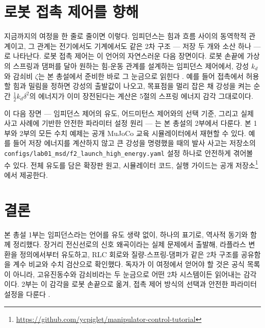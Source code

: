 \section{로봇 접촉 제어를 향해}
\label{sec:u3-outlook}

지금까지의 여정을 한 줄로 줄이면 이렇다.
임피던스는 힘과 흐름 사이의 동역학적 관계이고, 그 관계는 전기에서도
기계에서도 같은 2차 구조 --- 저장 두 개와 소산 하나 --- 로 나타난다.
로봇 접촉 제어는 이 언어의 자연스러운 다음 장면이다.
로봇 손끝에 가상의 스프링과 댐퍼를 달아 원하는 힘-운동 관계를 설계하는
임피던스 제어에서, 강성 \(k_d\)와 감쇠비 \(\zeta\)는 본 총설에서 준비한
바로 그 눈금으로 읽힌다 \cite{hogan1985impedancepart1}.
예를 들어 접촉에서 허용할 힘과 밀림을 정하면 강성의 출발값이 나오고,
목표점을 멀리 잡은 채 강성을 켜는 순간 \(\frac{1}{2}k_d\delta^2\)의
에너지가 이미 장전된다는 계산은 5절의 스프링 에너지 감각 그대로이다.

이 다음 장면 --- 임피던스 제어의 유도, 어드미턴스 제어와의 선택 기준,
그리고 실제 사고 사례에 기반한 안전한 파라미터 설정 원리 --- 는 본 총설의
2부에서 다룬다.
본 1부와 2부의 모든 수치 예제는 공개 MuJoCo \cite{todorov2012mujoco} 교육
시뮬레이터에서 재현할 수 있다.
예를 들어 저장 에너지를 계산하지 않고 큰 강성을 명령했을 때의 발사 사고는
저장소의 \texttt{configs/lab01\_msd/f2\_launch\_high\_energy.yaml} 설정
하나로 안전하게 겪어볼 수 있다.
전체 유도를 담은 확장판 원고, 시뮬레이터 코드, 실행 가이드는 공개
저장소\footnote{\url{https://github.com/ycpiglet/manipulator-control-tutorial}}에서
제공한다.

\section{결론}
\label{sec:u3-conclusion}

본 총설 1부는 임피던스라는 언어를 유도 생략 없이, 하나의 표기로, 역사적
동기와 함께 정리했다.
장거리 전신선로의 신호 왜곡이라는 실제 문제에서 출발해, 라플라스 변환을
정의에서부터 유도하고, RLC 회로와 질량-스프링-댐퍼가 같은 2차 구조를
공유함을 계수 비교와 수치 검산으로 확인했다.
독자가 이 여정에서 얻어야 할 것은 공식 목록이 아니라, 고유진동수와
감쇠비라는 두 눈금으로 어떤 2차 시스템이든 읽어내는 감각이다.
2부는 이 감각을 로봇 손끝으로 옮겨, 접촉 제어 방식의 선택과 안전한
파라미터 설정을 다룬다 \cite{lynchpark2017modernrobotics}.
